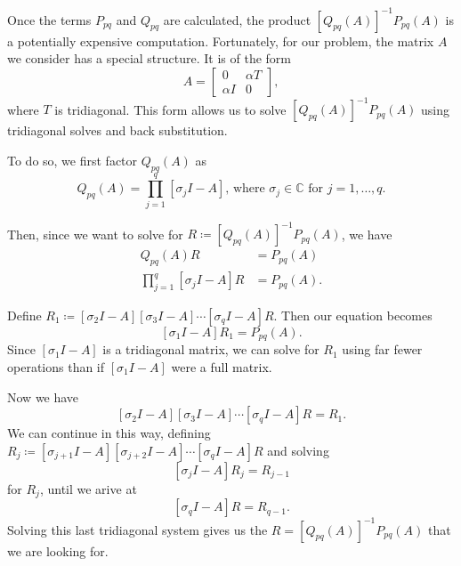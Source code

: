 \documentclass{csri19}
\begin{document}
Once the terms $P_{pq}$ and $Q_{pq}$ are calculated, the product 
$\left[Q_{pq}(A)\right]^{-1}P_{pq}(A)$ is a potentially expensive 
computation. Fortunately, for our problem, the matrix $A$ we consider has a
 special structure. It is of the form 
\[A= \begin{bmatrix} 0 & \alpha T\\
  \alpha I & 0 \end{bmatrix},\]
where $T$ is tridiagonal. This form allows us to solve 
$\left[Q_{pq}(A)\right]^{-1}P_{pq}(A)$ using tridiagonal solves and back 
substitution.

To do so, we first factor $Q_{pq}(A)$ as
\[ Q_{pq}(A) = \prod_{j=1}^q\left[\sigma_jI-A\right]\text{, where }\sigma_j\in \mathbb{C}\text{ for }j=1,\dots,q.\]

Then, since we want to solve for 
$R \coloneqq \left[Q_{pq}(A)\right]^{-1}P_{pq}(A)$, we have
\begin{align*}
Q_{pq}(A) R &= P_{pq}(A)\\
\prod_{j=1}^q\left[\sigma_jI-A\right]R &= P_{pq}(A).
\end{align*}

Define $R_1 \coloneqq \left[\sigma_2I-A\right]\left[\sigma_3I-A\right]\cdots\left[\sigma_qI-A\right]R$.
Then our equation becomes
\[ \left[\sigma_1I-A\right]R_1 = P_{pq}(A).\] Since $\left[\sigma_1I-A\right]$ 
is a tridiagonal matrix, we can solve for $R_1$ using far fewer operations
 than if $\left[\sigma_1I-A\right]$ were a full matrix.

Now we have
\[\left[\sigma_2I-A\right]\left[\sigma_3I-A\right]\cdots\left[\sigma_qI-A\right]R = R_1.\] 
We can continue in this way, defining 
$R_j \coloneqq \left[\sigma_{j+1}I-A\right]\left[\sigma_{j+2}I-A\right]\cdots\left[\sigma_qI-A\right]R$
 and solving
\[\left[\sigma_jI-A\right]R_j = R_{j-1}\] 
for $R_j$, until we arive at
\[\left[\sigma_qI-A\right]R = R_{q-1}.\] 
Solving this last tridiagonal system gives us the $R = \left[Q_{pq}(A)\right]^{-1}P_{pq}(A)$
 that we are looking for.
\end{document}
